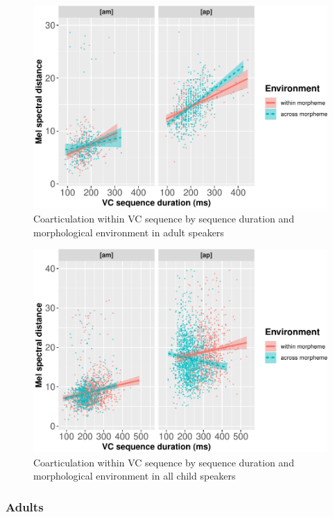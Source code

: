 \documentclass[
]{article}
\begin{document}
~
~

\begin{figure}
\centering
\includegraphics{3_ch3_results_files/figure-latex/adult-int-plot-1.pdf}
\caption{\label{fig:adult-int-plot}Coarticulation within VC sequence by sequence duration and morphological environment in adult speakers}
\end{figure}

\begin{figure}
\centering
\includegraphics{3_ch3_results_files/figure-latex/child-int-plot-1.pdf}
\caption{\label{fig:child-int-plot}Coarticulation within VC sequence by sequence duration and morphological environment in all child speakers}
\end{figure}

\hypertarget{adults}{%
\subsubsection{Adults}\label{adults}}
\end{document}
